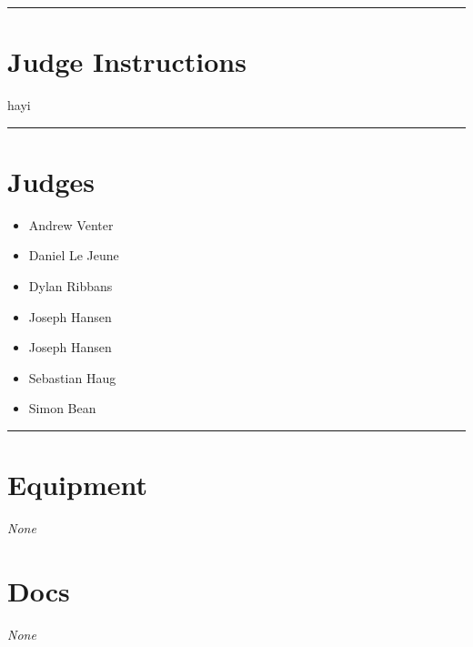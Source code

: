 \documentclass[10pt]{article}
\begin{document}
	\vspace{0.5cm}
	\hrule
	\vspace{0.5cm}

		\section*{Judge Instructions}
		hayi
\vspace{0.5cm}
	\hrule
	\vspace{0.5cm}
		\section*{\faUsers \: Judges}

		

	\begin{multicols}{2}

		\begin{itemize}
									\item Andrew Venter
									\item Daniel Le Jeune
									\item Dylan Ribbans
									\item Joseph Hansen
						\end{itemize}

		\vfill\null
		\columnbreak

		\begin{itemize}
									\item Joseph Hansen
									\item Sebastian Haug
									\item Simon Bean
						\end{itemize}

		\vfill\null

		\end{multicols}



			\vspace{0.5cm}
	\hrule
	\vspace{0.5cm}

	\begin{multicols}{2}

		\section*{\faWrench \: Equipment}

				\textit{None}
		
		\vfill\null
		\columnbreak

			\section*{\faFile \: Docs}
		 	\textit{None}
	

		\vfill\null

		\end{multicols}



	\vspace{1cm}


	\clearpage
	
\end{document}

